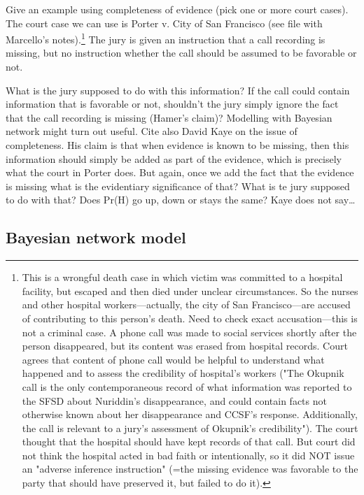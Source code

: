 \documentclass[
  10pt,
  dvipsnames,enabledeprecatedfontcommands]{scrartcl}
\begin{document}
Give an example using completeness of evidence (pick one or more court
cases). The court case we can use is Porter v. City of San Francisco
(see file with Marcello's
notes).\footnote{This is a wrongful death case in which victim was committed to a hospital facility, but escaped and then died under unclear circumstances. So the nurses and other hospital workers---actually, the city of San Francisco---are accused of contributing to this person's death. Need to check exact accusation---this is not a criminal case. A phone call was made to social services shortly after the person disappeared, but its content was erased from hospital records. Court agrees that content of phone call would be helpful to understand what happened and to assess the credibility of hospital's workers ("The Okupnik call is the only contemporaneous record of what information was reported to the SFSD about Nuriddin’s disappearance, and could contain facts not otherwise known about her disappearance and CCSF’s response. Additionally, the call is relevant to a jury’s assessment of Okupnik’s credibility"). The court thought that the hospital should have kept records of that call. But court did not think the hospital acted in bad faith or intentionally, so it did NOT issue an "adverse inference instruction" (=the missing evidence was favorable to the party that should have preserved it, but failed to do it).}
The jury is given an instruction that a call recording is missing, but
no instruction whether the call should be assumed to be favorable or
not.

What is the jury supposed to do with this information? If the call could
contain information that is favorable or not, shouldn't the jury simply
ignore the fact that the call recording is missing (Hamer's claim)?
Modelling with Bayesian network might turn out useful. Cite also David
Kaye on the issue of completeness. His claim is that when evidence is
known to be missing, then this information should simply be added as
part of the evidence, which is precisely what the court in Porter does.
But again, once we add the fact that the evidence is missing what is the
evidentiary significance of that? What is te jury supposed to do with
that? Does Pr(H) go up, down or stays the same? Kaye does not
say\ldots{}

\hypertarget{bayesian-network-model}{%
\subsection{Bayesian network model}\label{bayesian-network-model}}
\end{document}
